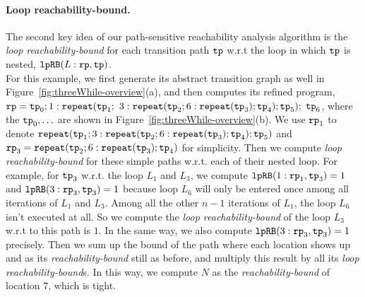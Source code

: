 \paragraph*{Loop reachability-bound.}
The second key idea of our path-sensitive reachability analysis algorithm is the
\emph{loop reachability-bound} for each transition path $\mathtt{tp}$ w.r.t the loop in which $\mathtt{tp}$ is nested,
$\mathtt{lpRB}(L:\mathtt{rp}, \mathtt{tp})$.
\\
For this example, we first generate its abstract transition graph as well in Figure~\ref{fig:threeWhile-overview}(a),
and then computes its refined program,
$\mathtt{rp} = \mathtt{tp}_0; 1: \mathtt{repeat}(\mathtt{tp}_1;$ 
$3: {\mathtt{repeat}(\mathtt{tp}_2; 6 : {\mathtt{repeat}(\mathtt{tp}_3)}; \mathtt{tp}_4)}; \mathtt{tp}_5);$ 
$\mathtt{tp}_6$,
where the $\mathtt{tp}_0, \ldots$ are shown in Figure~\ref{fig:threeWhile-overview}(b).
We use $\mathtt{rp}_1$ to denote ${\mathtt{repeat}(\mathtt{tp}_1; 3: {\mathtt{repeat}(\mathtt{tp}_2; 6 : {\mathtt{repeat}(\mathtt{tp}_3)}; \mathtt{tp}_4)}; \mathtt{tp}_5)}$
and $\mathtt{rp}_3 = {\mathtt{repeat}(\mathtt{tp}_2; 6 : {\mathtt{repeat}(\mathtt{tp}_3)}; \mathtt{tp}_4)}$
for simplicity.
Then we compute \emph{loop reachability-bound} for these simple paths w.r.t. each of their nested loop.
For example, for $\mathtt{tp}_3$ w.r.t. the loop $L_1$ and $L_3$, we compute
$\mathtt{lpRB}(1: \mathtt{rp}_1, \mathtt{tp}_3) = 1$ and
$\mathtt{lpRB}(3: \mathtt{rp}_3, \mathtt{tp}_3) = 1$ because loop $L_6$ will only be entered once among all iterations of $L_1$ and $L_3$.
Among all the other $n - 1$ iterations of $L_1$, the loop $L_6$ isn't executed at all.
So we compute the \emph{loop reachability-bound}  of the loop $L_3$
w.r.t to this path is $1$.
In the same way, we also compute $\mathtt{lpRB}(3: \mathtt{rp}_3, \mathtt{tp}_3) = 1$ precisely.
Then we sum up the bound of the path where each location shows up
and as its \emph{reachability-bound} still as before,
and multiply this result by all its \emph{loop reachability-bound}s.
In this way, we compute $N$ as the \emph{reachability-bound} of location $7$, which is tight.

